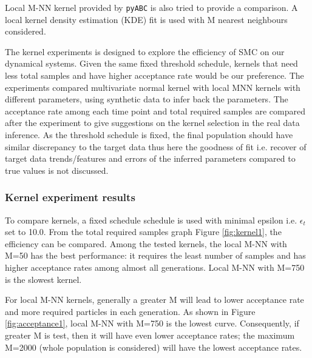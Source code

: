 Local M-NN kernel provided by \verb|pyABC| is also tried to provide a comparison. A local kernel density estimation (KDE) fit is used with M nearest neighbours considered.

The kernel experiments is designed to explore the efficiency of SMC on our dynamical systems. Given the same fixed threshold schedule, kernels that need less total samples and have higher acceptance rate would be our preference. The experiments compared multivariate normal kernel with local MNN kernels with different parameters, using synthetic data to infer back the parameters. The acceptance rate among each time point and total required samples are compared after the experiment to give suggestions on the kernel selection in the real data inference. As the threshold schedule is fixed, the final population should have similar discrepancy to the target data thus here the goodness of fit i.e. recover of target data trends/features and errors of the inferred parameters compared to true values is not discussed.

\subsubsection{Kernel experiment results}

To compare kernels, a fixed schedule schedule is used with minimal epsilon i.e. $\epsilon_t$ set to 10.0. From the total required samples graph Figure \ref{fig:kernel1}, the efficiency can be compared. Among the tested kernels, the local M-NN with M=50 has the best performance: it requires the least number of samples and
has higher acceptance rates among almost all generations. Local M-NN with M=750 is the slowest kernel.

For local M-NN kernels, generally a greater M will lead to lower acceptance rate and
more required particles in each generation. As shown in Figure \ref{fig:acceptance1}, local M-NN with M=750 is the lowest curve. Consequently, if greater M is test, then it will have even lower acceptance rates; the maximum M=2000 (whole population is considered) will have the lowest acceptance rates.

